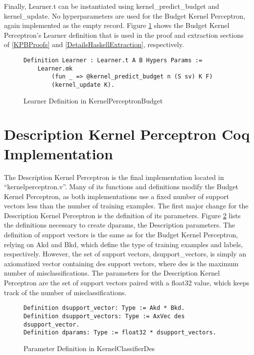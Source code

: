 Finally, Learner.t can be instantiated using kernel\_predict\_budget and kernel\_update. No hyperparameters are used for the Budget Kernel Perceptron, again implemented as the empty record. Figure \ref{kpbLearnerDef} shows the Budget Kernel Perceptron's Learner definition that is used in the proof and extraction sections of \ref{KPBProofs} and \ref{DetailsHaskellExtraction}, respectively.

\begin{figure}
    \caption{Learner Definition in KernelPerceptronBudget}
    \label{kpbLearnerDef}
    \begin{lstlisting}
Definition Learner : Learner.t A B Hypers Params :=
    Learner.mk
        (fun _ => @kernel_predict_budget n (S sv) K F)
        (kernel_update K).
    \end{lstlisting}
\end{figure}

\section{Description Kernel Perceptron Coq Implementation}\label{KPDCoqImp}

The Description Kernel Perceptron is the final implementation located in ``kernelperceptron.v''. Many of its functions and definitions modify the Budget Kernel Perceptron, as both implementations use a fixed number of support vectors less than the number of training examples. The first major change for the Description Kernel Perceptron is the definition of its parameters. Figure \ref{KPDsupportDef} lists the definitions necessary to create dparams, the Description parameters. The definition of support vectors is the same as for the Budget Kernel Perceptron, relying on Akd and Bkd, which define the type of training examples and labels, respectively. However, the set of support vectors, dsupport\_vectors, is simply an axiomatized vector containing des support vectors, where des is the maximum number of misclassifications. The parameters for the Description Kernel Perceptron are the set of support vectors paired with a float32 value, which keeps track of the number of misclassifications.

\begin{figure}
    \caption{Parameter Definition in KernelClassifierDes}
    \label{KPDsupportDef}
    \begin{lstlisting}
Definition dsupport_vector: Type := Akd * Bkd.
Definition dsupport_vectors: Type := AxVec des dsupport_vector.
Definition dparams: Type := float32 * dsupport_vectors.
    \end{lstlisting}
\end{figure}

